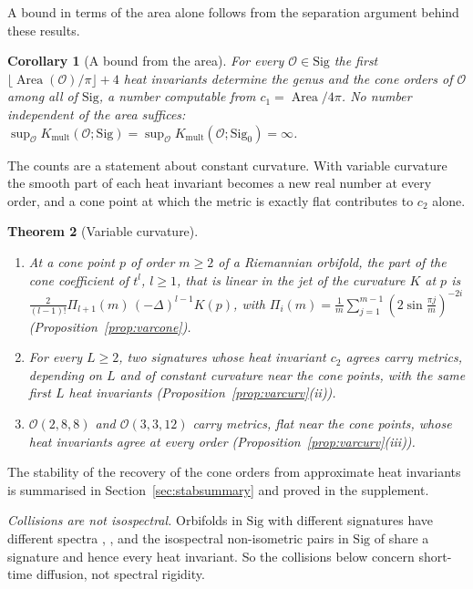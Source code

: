 \documentclass[pdflatex,sn-mathphys-num]{sn-jnl}
\theoremstyle{thmstyleone}%
\newtheorem{theorem}{Theorem}[section]%
\newtheorem{corollary}[theorem]{Corollary}%
\theoremstyle{thmstylethree}%
\newcommand{\Orb}{\mathcal{O}}
\newcommand{\Sig}{\mathrm{Sig}}
\newcommand{\Kmult}{K_{\mathrm{mult}}}
\newcommand{\Area}{\operatorname{Area}}
\begin{document}
A bound in terms of the area alone follows from the separation argument behind these results.

\begin{corollary}[A bound from the area]\label{cor:intro-area}
For every $\Orb\in\Sig$ the first $\lfloor\Area(\Orb)/\pi\rfloor+4$ heat invariants determine the genus and the cone orders of $\Orb$ among all of $\Sig$, a number computable from $c_1=\Area/4\pi$. No number independent of the area suffices: $\sup_\Orb\Kmult(\Orb;\Sig)=\sup_\Orb\Kmult(\Orb;\Sig_0)=\infty$.
\end{corollary}

The counts are a statement about constant curvature. With variable curvature the smooth part of each heat invariant becomes a new real number at every order, and a cone point at which the metric is exactly flat contributes to $c_2$ alone.

\begin{theorem}[Variable curvature]\label{thm:intro-varcurv}
\leavevmode
\begin{enumerate}[label=(\roman*)]
\item At a cone point $p$ of order $m\ge2$ of a Riemannian orbifold, the part of the cone coefficient of $t^l$, $l\ge1$, that is linear in the jet of the curvature $K$ at $p$ is $\frac2{(l-1)!}\Pi_{l+1}(m)\,(-\Delta)^{l-1}K(p)$, with $\Pi_i(m)=\frac1m\sum_{j=1}^{m-1}(2\sin\frac{\pi j}m)^{-2i}$ (Proposition~\ref{prop:varcone}).
\item For every $L\ge2$, two signatures whose heat invariant $c_2$ agrees carry metrics, depending on $L$ and of constant curvature near the cone points, with the same first $L$ heat invariants (Proposition~\ref{prop:varcurv}(ii)).
\item $\Orb(2,8,8)$ and $\Orb(3,3,12)$ carry metrics, flat near the cone points, whose heat invariants agree at every order (Proposition~\ref{prop:varcurv}(iii)).
\end{enumerate}
\end{theorem}

The stability of the recovery of the cone orders from approximate heat invariants is summarised in Section~\ref{sec:stabsummary} and proved in the supplement.

\emph{Collisions are not isospectral.} Orbifolds in $\Sig$ with different signatures have different spectra \cite[Thm~1.1, Prop.~3.3]{drydenstrohmaier2009}, \cite[Thm~1]{doylerossetti2011}, and the isospectral non-isometric pairs in $\Sig$ of \cite[Thm~A]{linowitzvoight2015} share a signature and hence every heat invariant. So the collisions below concern short-time diffusion, not spectral rigidity.
\end{document}
